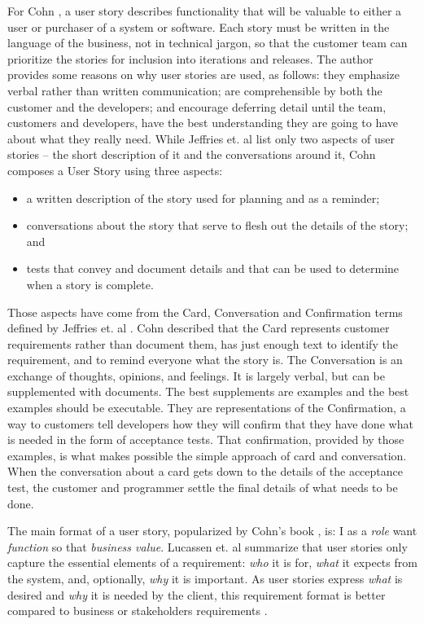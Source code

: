For Cohn \cite{Cohn_2004}, a user story describes functionality that will be valuable to either a user or purchaser of a system or software. Each story must be written in the language of the business, not in technical jargon, so that the customer team can prioritize the stories for inclusion into iterations and releases. The author provides some reasons on why user stories are used, as follows: they emphasize verbal rather than written communication; are comprehensible by both the customer and the developers; and encourage deferring detail until the team, customers and developers, have the best understanding they are going to have about what they really need. While Jeffries et. al \cite{Jeffries_et_dot_al_2000} list only two aspects of user stories -- the short description of it and the conversations around it, Cohn \cite{Cohn_2004} composes a User Story using three aspects:

\begin{itemize}
    \item a written description of the story used for planning and as a reminder;
    \item conversations about the story that serve to flesh out the details of the story; and
    \item tests that convey and document details and that can be used to determine when a story is complete.
\end{itemize}

Those aspects have come from the Card, Conversation and Confirmation terms defined by Jeffries et. al \cite{Jeffries_2001}. Cohn described that the Card represents customer requirements rather than document them, has just enough text to identify the requirement, and to remind everyone what the story is. The Conversation is an exchange of thoughts, opinions, and feelings. It is largely verbal, but can be supplemented with documents. The best supplements are examples and the best examples should be executable. They are representations of the Confirmation, a way to customers tell developers how they will confirm that they have done what is needed in the form of acceptance tests. That confirmation, provided by those examples, is what makes possible the simple approach of card and conversation. When the conversation about a card gets down to the details of the acceptance test, the customer and programmer settle the final details of what needs to be done.

The main format of a user story, popularized by Cohn's book \cite{Cohn_2004}, is: I as a \textit{role} want \textit{function} so that \textit{business value}. Lucassen et. al \cite{Lucassen_et_dot_al_2015} summarize that user stories only capture the essential elements of a requirement: \textit{who} it is for, \textit{what} it expects from the system, and, optionally, \textit{why} it is important. As user stories express \textit{what} is desired and \textit{why} it is needed by the client, this requirement format is better compared to business or stakeholders requirements \cite{Babok_2009}\cite{Babok_2015}.

